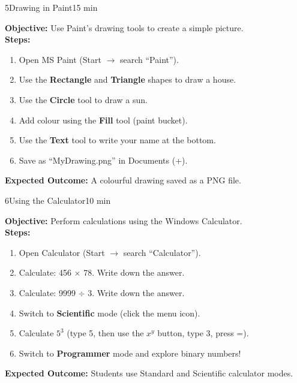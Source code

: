 \begin{labactivity}{5}{Drawing in Paint}{15 min}

\textbf{Objective:} Use Paint's drawing tools to create a simple picture.\\[4pt]
\textbf{Steps:}
\begin{enumerate}[label=\protect\stepcircle{\arabic*}, leftmargin=2cm, itemsep=4pt]
  \item Open MS Paint (Start $\rightarrow$ search ``Paint'').
  \item Use the \textbf{Rectangle} and \textbf{Triangle} shapes to draw a house.
  \item Use the \textbf{Circle} tool to draw a sun.
  \item Add colour using the \textbf{Fill} tool (paint bucket).
  \item Use the \textbf{Text} tool to write your name at the bottom.
  \item Save as ``MyDrawing.png'' in Documents (+).
\end{enumerate}
\textbf{Expected Outcome:} A colourful drawing saved as a PNG file.
\welldone
\end{labactivity}

\begin{labactivity}{6}{Using the Calculator}{10 min}

\textbf{Objective:} Perform calculations using the Windows Calculator.\\[4pt]
\textbf{Steps:}
\begin{enumerate}[label=\protect\stepcircle{\arabic*}, leftmargin=2cm, itemsep=4pt]
  \item Open Calculator (Start $\rightarrow$ search ``Calculator'').
  \item Calculate: 456 $\times$ 78. Write down the answer.
  \item Calculate: 9999 $\div$ 3. Write down the answer.
  \item Switch to \textbf{Scientific} mode (click the menu icon).
  \item Calculate $5^3$ (type 5, then use the $x^y$ button, type 3, press =).
  \item Switch to \textbf{Programmer} mode and explore binary numbers!
\end{enumerate}
\textbf{Expected Outcome:} Students use Standard and Scientific calculator modes.
\welldone
\end{labactivity}

